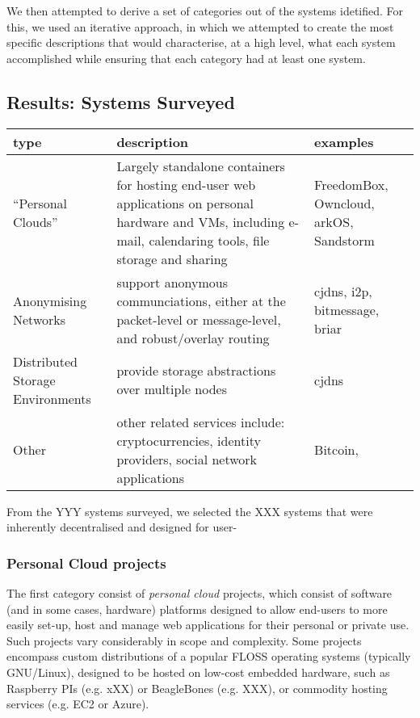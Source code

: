 \documentclass{acm_proc_article-sp}
\begin{document}
{We then attempted to derive a set of categories out of the systems idetified.  For this, we used an iterative approach, in which we attempted to create the most specific descriptions that would characterise, at a high level, what each system accomplished while ensuring that each category had at least one system.

\subsection{Results: Systems Surveyed}

\begin{figure*}[tb]
\begin{tabular}{ l p{2.8in} p{2.3in} }
type & description & examples \\ \hline
  ``Personal Clouds'' & Largely standalone containers for hosting end-user web applications on personal hardware and VMs, including e-mail, calendaring tools, file storage and sharing & FreedomBox, Owncloud, arkOS, Sandstorm \\
  Anonymising Networks & support anonymous communciations, either at the packet-level or message-level, and robust/overlay routing & cjdns, i2p, bitmessage, briar \\
  Distributed Storage Environments & provide storage abstractions over multiple nodes & cjdns \\
  Other & other related services include: cryptocurrencies, identity providers, social network applications & Bitcoin, \\
\end{tabular}
\end{figure*}

From the YYY systems surveyed, we selected the XXX systems that were inherently decentralised and designed for user-

\subsubsection{Personal Cloud projects}

The first category consist of \emph{personal cloud} projects, which consist of software (and in some cases, hardware) platforms designed to allow end-users to more easily set-up, host and manage web applications for their personal or private use.  Such projects vary considerably in scope and complexity. Some projects encompass custom distributions of a popular FLOSS operating systems (typically GNU/Linux), designed to be hosted on low-cost embedded hardware, such as Raspberry PIs (e.g. xXX) or BeagleBones (e.g. XXX), or commodity hosting services (e.g. EC2 or Azure). 

}
\end{document}
